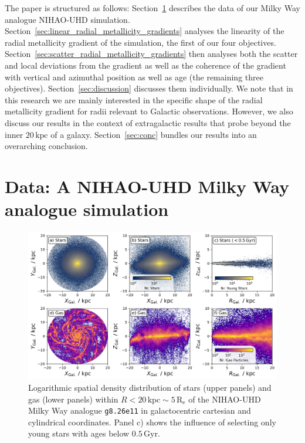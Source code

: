 \documentclass[fleqn,usenatbib]{mnras}
\newcommand{\nihaoAGEmax}{$0.5\,\mathrm{Gyr}$}
\begin{document}
The paper is structured as follows: Section~\ref{sec:data} describes the data of our Milky Way analogue NIHAO-UHD simulation. Section~\ref{sec:linear_radial_metallicity_gradients} analyses the linearity of the radial metallicity gradient of the simulation, the first of our four objectives. Section~\ref{sec:scatter_radial_metallicity_gradients} then analyses both the scatter and local deviations from the gradient as well as the coherence of the gradient with vertical and azimuthal position as well as age (the remaining three objectives). Section~\ref{sec:discussion} discusses them individually. We note that in this research we are mainly interested in the specific shape of the radial metallicity gradient for radii relevant to Galactic observations. However, we also discuss our results in the context of extragalactic results that probe beyond the inner $20\,\mathrm{kpc}$ of a galaxy. Section~\ref{sec:conc} bundles our results into an overarching conclusion. 

\section{Data: A NIHAO-UHD Milky Way analogue simulation} \label{sec:data}

\begin{figure}
    \centering
    \includegraphics[width=\textwidth]{figures/stars_and_gas_overview.png}
    \caption{Logarithmic spatial density distribution of stars (upper panels) and gas (lower panels) within $R < 20\,\mathrm{kpc} \sim 5\,\mathrm{R_e}$ of the NIHAO-UHD Milky Way analogue \texttt{g8.26e11} in galactocentric cartesian and cylindrical coordinates. Panel c) shows the influence of selecting only young stars with ages below \nihaoAGEmax.}
    \label{fig:stars_and_gas_overview}
\end{figure}
\end{document}
